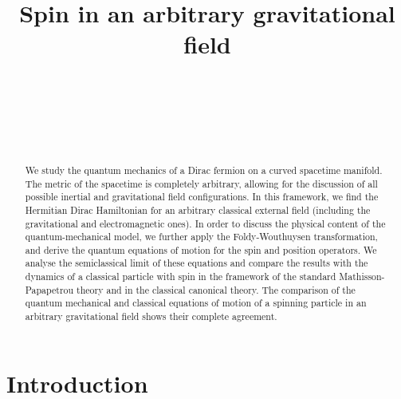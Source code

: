 \documentclass[preprint,showpacs,preprintnumbers,eqsecnum,amsmath,amssymb]{revtex4-1}
\begin{document}

\title{Spin in an arbitrary gravitational field}

\author{~}

\author{~}
 

\author{~}
 


\begin {abstract}
We study the quantum mechanics of a Dirac fermion on a curved
spacetime manifold. The metric of the spacetime is completely arbitrary,
allowing for the discussion of all possible inertial and gravitational
field configurations. In this framework, we find the Hermitian Dirac
Hamiltonian for an arbitrary classical external field (including the
gravitational and electromagnetic ones). In order to discuss the physical
content of the quantum-mechanical model, we further apply the Foldy-Wouthuysen
transformation, and derive the quantum equations of motion for the spin and
position operators. We analyse the semiclassical limit of these equations
and compare the results with the dynamics of a classical particle with
spin in the framework of the standard Mathisson-Papapetrou theory and in
the classical canonical theory. The comparison of the quantum mechanical
and classical equations of motion of a spinning particle in an arbitrary
gravitational field shows their complete agreement.
\end{abstract}

 \maketitle


\section{Introduction}
\end{document}
